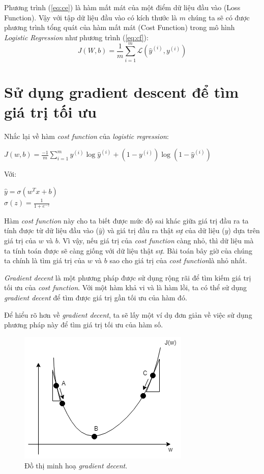Phương trình (\ref{eq:ce}) là hàm mất mát của một điểm dữ liệu đầu vào (Loss Function). Vậy với tập dữ liệu đầu vào có kích thước là $m$ chúng ta sẽ có được phương trình tổng quát của hàm mất mát (Cost Function) trong mô hình \textit{Logistic Regression} như phương trình (\ref{eq:cf}):
\begin{equation}
    J(W, b) = \frac{1}{m}\sum_{i = 1}^m\mathcal{L}(\hat{y}^{(i)}, y^{(i)})
    \label{eq:cf}
\end{equation}

\section{Sử dụng gradient descent để tìm giá trị tối ưu}
Nhắc lại về hàm \textit{cost function} của \textit{logistic regression}:
\begin{center}
$J(w, b) = \frac{-1}{m}\sum_{i=1}^{m}y^{(i)}\log \hat{y}^{(i)}+(1-y^{(i)})\log (1-\hat{y}^{(i)})$
\end{center}
Với:
\begin{center}
$\hat{y}=\sigma (w^{T}x + b)$\\
$\sigma (z) = \frac{1}{1+e^{-z}}$\\
\end{center}

Hàm \textit{cost function} này cho ta biết được mức độ sai khác giữa giá trị đầu ra ta tính được từ dữ liệu đầu vào ($\hat{y}$) và giá trị đầu ra thật sự của dữ liệu ($y$) dựa trên giá trị của $w$ và $b$. Vì vậy, nếu giá trị của \textit{cost function} càng nhỏ, thì dữ liệu mà ta tính toán được sẽ càng giống với dữ liệu thật sự. Bài toán bây giờ của chúng ta chính là tìm giá trị của $w$ và $b$ sao cho giá trị của \textit{cost function}là nhỏ nhất.

\textit{Gradient decent} là một phương pháp được sử dụng rộng rãi để tìm kiếm giá trị tối ưu của \textit{cost function}. Với một hàm khả vi và là hàm lồi, ta có thể sử dụng \textit{gradient decent} để tìm được giá trị gần tối ưu của hàm đó.

Để hiểu rõ hơn về \textit{gradient decent}, ta sẽ lấy một ví dụ đơn giản về việc sử dụng phương pháp này để tìm giá trị tối ưu của hàm số.
\clearpage
\begin{figure}[!h]
\centerline{\includegraphics{chapter02/figure/grad_1.png}}
\caption{Đồ thị minh hoạ \textit{gradient decent}.}
\label{fig:grad_1}
\end{figure}

